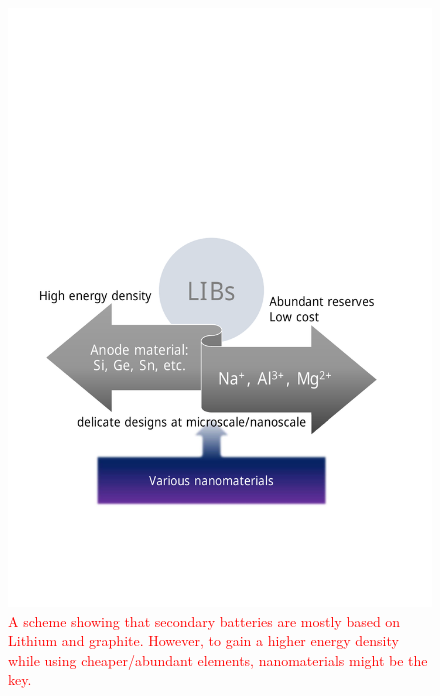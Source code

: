 \begin{figure}  
\centering
\includegraphics[width=340pt]{figures/figure1_lib.pdf}
\caption[Future of secondary ion batteries]{\textcolor{red}{A scheme showing that secondary batteries are mostly based on Lithium and graphite. However, to gain a higher energy density while using cheaper/abundant elements, nanomaterials might be the key. }
\label{fig:1lib}}
\end{figure}


